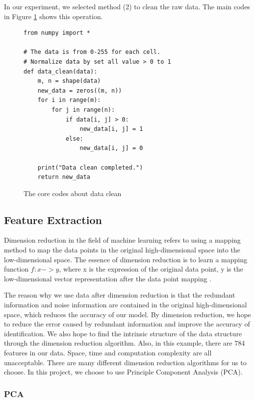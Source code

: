 \documentclass[sigconf]{acmart}
\begin{document}
In our experiment, we selected method (2) to clean the raw data. The main codes in Figure \ref{fig:data clean} shows this operation.

\begin{figure}[htb]
\centering
\begin{lstlisting}
from numpy import *

# The data is from 0-255 for each cell.
# Normalize data by set all value > 0 to 1
def data_clean(data):
    m, n = shape(data)
    new_data = zeros((m, n))
    for i in range(m):
        for j in range(n):
            if data[i, j] > 0:
                new_data[i, j] = 1
            else:
                new_data[i, j] = 0
                
    print("Data clean completed.")
    return new_data
\end{lstlisting}
\caption{The core codes about data clean}\label{fig:data clean}
\end{figure}

\subsection{Feature Extraction}

Dimension reduction in the field of machine learning refers to using a mapping method to map the data points in the original high-dimensional space into the low-dimensional space. The essence of dimension reduction is to learn a mapping function \(f:x->y\), where x is the expression of the original data point, y is the low-dimensional vector representation after the data point mapping \cite{feature_extra}. 

The reason why we use data after dimension reduction is that the redundant information and noise information are contained in the original high-dimensional space, which reduces the accuracy of our model. By dimension reduction, we hope to reduce the error caused by redundant information and improve the accuracy of identification. We also hope to find the intrinsic structure of the data structure through the dimension reduction algorithm. Also, in this example, there are 784 features in our data. Space, time and computation complexity are all unacceptable. There are many different dimension reduction algorithms for us to choose. In this project, we choose to use Principle Component Analysis (PCA).

\subsubsection{PCA}
\end{document}
